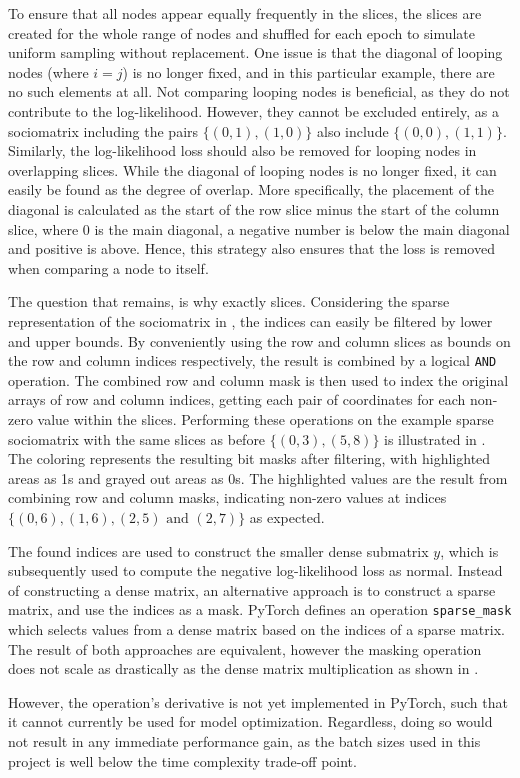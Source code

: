         To ensure that all nodes appear equally frequently in the slices, the slices are created for the whole range of nodes and shuffled for each epoch to simulate uniform sampling without replacement.
        One issue is that the diagonal of looping nodes (where $i=j$) is no longer fixed, and in this particular example, there are no such elements at all. Not comparing looping nodes is beneficial, as they do not contribute to the log-likelihood. However, they cannot be excluded entirely, as a sociomatrix including the pairs $\{(0,1), (1,0)\}$ also include $\{(0,0), (1,1)\}$. Similarly, the log-likelihood loss should also be removed for looping nodes in overlapping slices.
        While the diagonal of looping nodes is no longer fixed, it can easily be found as the degree of overlap. More specifically, the placement of the diagonal is calculated as the start of the row slice minus the start of the column slice, where 0 is the main diagonal, a negative number is below the main diagonal and positive is above. Hence, this strategy also ensures that the loss is removed when comparing a node to itself.
        
        The question that remains, is why exactly slices. Considering the sparse representation of the sociomatrix in , the indices can easily be filtered by lower and upper bounds. By conveniently using the row and column slices as bounds on the row and column indices respectively, the result is combined by a logical \texttt{AND} operation. The combined row and column mask is then used to index the original arrays of row and column indices, getting each pair of coordinates for each non-zero value within the slices. Performing these operations on the example sparse sociomatrix with the same slices as before $\{(0,3), (5,8)\}$ is illustrated in . The coloring represents the resulting bit masks after filtering, with highlighted areas as 1s and grayed out areas as 0s. The highlighted values are the result from combining row and column masks, indicating non-zero values at indices $\{(0,6),(1,6),(2,5) \text{ and } (2,7)\}$ as expected.
        
        The found indices are used to construct the smaller dense submatrix $y$, which is subsequently used to compute the negative log-likelihood loss as normal.
        Instead of constructing a dense matrix, an alternative approach is to construct a sparse matrix, and use the indices as a mask. PyTorch defines an operation \texttt{sparse\_mask} which selects values from a dense matrix based on the indices of a sparse matrix. The result of both approaches are equivalent, however the masking operation does not scale as drastically as the dense matrix multiplication as shown in .
        
        However, the operation's derivative is not yet implemented in PyTorch, such that it cannot currently be used for model optimization. Regardless, doing so would not result in any immediate performance gain, as the batch sizes used in this project is well below the time complexity trade-off point.
        
        
